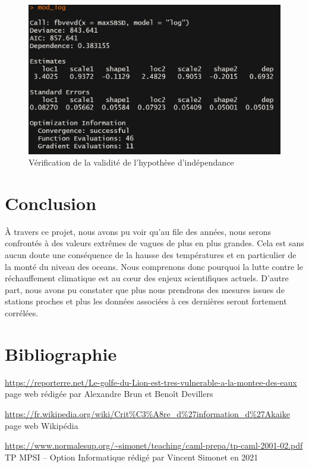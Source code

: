 \documentclass[a4paper,french,10pt]{article}
\begin{document}
\begin{figure}[htp] 
	\centering
	\includegraphics[scale=0.45]{images/dependance_log3.png}
	\caption{Vérification de la validité de l'hypothèse d'indépendance}
	\label{dependance_log3}
\end{figure}

\newpage

\section{Conclusion}
À travers ce projet, nous avons pu voir qu'au file des années, nous serons confrontés à des valeurs extrêmes de vagues de plus en plus grandes. Cela est sans aucun doute une conséquence de la hausse des températures et en particulier de la monté du niveau des oceans. Nous comprenons donc pourquoi la lutte contre le réchauffement climatique est au cœur des enjeux scientifiques actuels. D'autre part, nous avons pu constater que plus nous prendrons des mesures issues de stations proches et plus les données associées à ces dernières seront fortement corrélées. 

%

\newpage

\section{Bibliographie}

\renewcommand\refname{}
\begin{thebibliography}{9}
	\url{https://reporterre.net/Le-golfe-du-Lion-est-tres-vulnerable-a-la-montee-des-eaux}
	page web rédigée par Alexandre Brun et Benoît Devillers
	
	\url{https://fr.wikipedia.org/wiki/Crit%C3%A8re_d%27information_d%27Akaike}
	page web Wikipédia
	
	\url{https://www.normalesup.org/~simonet/teaching/caml-prepa/tp-caml-2001-02.pdf}
	TP MPSI – Option Informatique rédigé par Vincent Simonet en 2021
\end{thebibliography}
\end{document}
